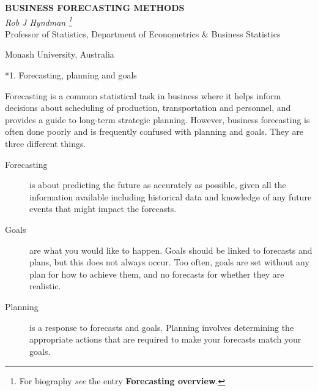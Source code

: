 \documentclass[10pt]{article}
\makeatletter
\renewcommand{\section}%
{\@startsection{section}{1}{0mm}{\baselineskip}{0.5\baselineskip}{\normalfont\large\rmfamily\bfseries}}
\makeatother
\begin{document}
\begin{center}

{\large \bf BUSINESS FORECASTING METHODS}\\[4mm]

{\large \it Rob J Hyndman \footnote{For biography \textit{see} the entry \textbf{Forecasting overview}.}}\\[2mm]

Professor of Statistics, Department of Econometrics \& Business Statistics

Monash University, Australia\\

\end{center}

\section*{1. Forecasting, planning and goals}

Forecasting is a common statistical task in business where it helps inform decisions about scheduling of production, transportation and personnel, and provides a guide to long-term strategic planning. However, business forecasting is often done poorly and is frequently confused with planning and goals. They are three different things.
\begin{description}
\item[Forecasting] is about predicting the future as accurately as possible, given all the information available including historical data and knowledge of any future events that might impact the forecasts.
\item[Goals] are what you would like to happen. Goals should be linked to forecasts and plans, but this does not always occur. Too often, goals are set without any plan for how to achieve them, and no forecasts for whether they are realistic.
\item[Planning] is a response to forecasts and goals. Planning involves determining the appropriate actions that are required to make your forecasts match your goals.
\end{description}
\end{document}
